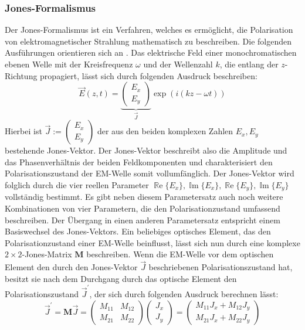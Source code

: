 \documentclass[a4paper, titlepage,  ngerman]{book}
\renewcommand{\Re}{\operatorname{\mathbb{R}e}}
\renewcommand{\Im}{\operatorname{\mathbb{I}m}}
\begin{document}
	\subsubsection{Jones-Formalismus}
	Der Jones-Formalismus ist ein Verfahren, welches es ermöglicht, die Polarisation von elektromagnetischer Strahlung mathematisch zu beschreiben. Die folgenden Ausführungen orientieren sich an \cite{Hecht.2018}. Das elektrische Feld einer monochromatischen ebenen Welle mit der Kreisfrequenz $\omega$ und der Wellenzahl $k$, die entlang der $z$-Richtung propagiert, lässt sich durch folgenden Ausdruck beschreiben:
	\begin{equation}
		\vec{E}(z, t) = \underbrace{\begin{pmatrix}E_x \\ E_y\end{pmatrix}}_{\vec{J}} \exp(i(kz-\omega t))
	\end{equation}
	Hierbei ist $\vec{J} := \begin{pmatrix}E_x \\ E_y\end{pmatrix}$ der aus den beiden komplexen Zahlen $E_x, E_y$ bestehende Jones-Vektor. Der Jones-Vektor beschreibt also die Amplitude und das Phasenverhältnis der beiden Feldkomponenten und charakterisiert den Polarisationszustand der EM-Welle somit vollumfänglich. Der Jones-Vektor wird folglich durch die vier reellen Parameter $\Re\{E_x\}, \Im\{E_x\}, \Re\{E_y\}, \Im\{E_y\}$ vollständig bestimmt. Es gibt neben diesem Parametersatz auch noch weitere Kombinationen von vier Parametern, die den Polarisationzustand umfassend beschreiben. Der Übergang in einen anderen Parametersatz entspricht einem Basiswechsel des Jones-Vektors.	Ein beliebiges optisches Element, das den Polarisationzustand einer EM-Welle beinflusst, lässt sich nun durch eine komplexe $2 \times 2$-Jones-Matrix $\boldsymbol{M}$ beschreiben. Wenn die EM-Welle vor dem optischen Element den durch den Jones-Vektor $\vec{J}$ beschriebenen Polarisationszustand hat, besitzt sie nach dem Durchgang durch das optische Element den Polarisationszustand $\vec{J}^\prime$, der sich durch folgenden Ausdruck berechnen lässt:
	\begin{equation}
		\vec{J}^\prime = \boldsymbol{M} \vec{J}  =  
		\begin{pmatrix}
			M_{11} & M_{12} \\
			M_{21} & M_{22}
		\end{pmatrix}
		\begin{pmatrix}
			J_x \\
			J_y
		\end{pmatrix} = 
		\begin{pmatrix}
			M_{11} J_x + M_{12} J_y \\
			M_{21} J_x + M_{22} J_y
		\end{pmatrix}		
	\end{equation}
\end{document}
